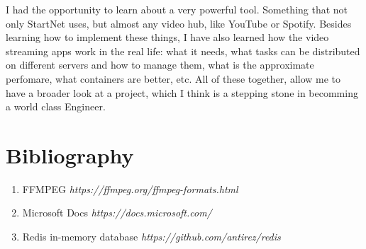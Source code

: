 \documentclass{article}
\begin{document}
		I had the opportunity to learn about a very powerful tool. Something that not only StartNet uses, but almost any video hub, like YouTube or Spotify. Besides learning how to implement these things, I have also learned how the video streaming apps work in the real life: what it needs, what tasks can be distributed on different servers and how to manage them, what is the approximate perfomare, what containers are better, etc. All of these together, allow me to have a broader look at a project, which I think is a stepping stone in becomming a world class Engineer.

	\section{Bibliography}
		\begin{enumerate}
			\item FFMPEG \textit{https://ffmpeg.org/ffmpeg-formats.html}
			\item Microsoft Docs \textit{https://docs.microsoft.com/}
			\item Redis in-memory database \textit{https://github.com/antirez/redis}
		\end{enumerate}
\end{document}
